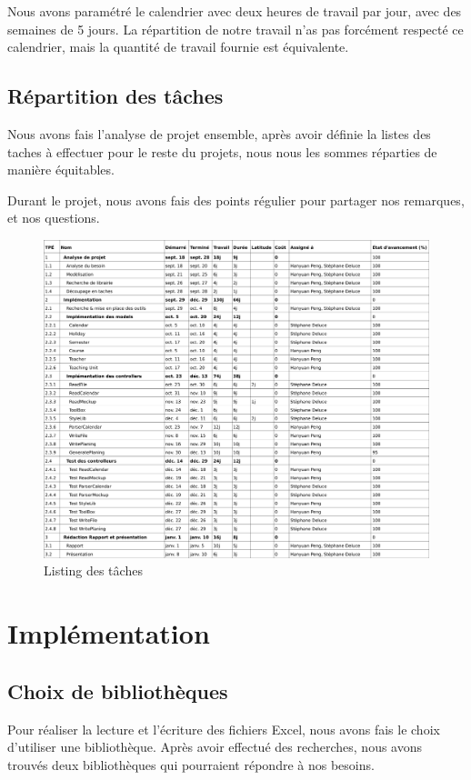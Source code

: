 \documentclass{polytech/polytech}
\begin{document}
	Nous avons paramétré le calendrier avec deux heures de travail par jour, avec des semaines de 5 jours.
	La répartition de notre travail n'as pas forcément respecté ce calendrier, mais la quantité de travail fournie est équivalente.

	\section{Répartition des tâches}
	
	Nous avons fais l'analyse de projet ensemble, après avoir définie la listes des taches à effectuer pour le reste du projets, nous nous les sommes réparties de manière équitables.
	
	Durant le projet, nous avons fais des points régulier pour partager nos remarques, et nos questions.
	
	\begin{figure}
		\caption{Listing des tâches}
		\includegraphics[width=\textwidth]{./img/taches-list.png}
	\end{figure}

	\chapter{Implémentation}

	\section{Choix de bibliothèques}

	Pour réaliser la lecture et l'écriture des fichiers Excel, nous avons fais le choix d'utiliser une bibliothèque.
	Après avoir effectué des recherches, nous avons trouvés deux bibliothèques qui pourraient répondre à nos besoins.
\end{document}
